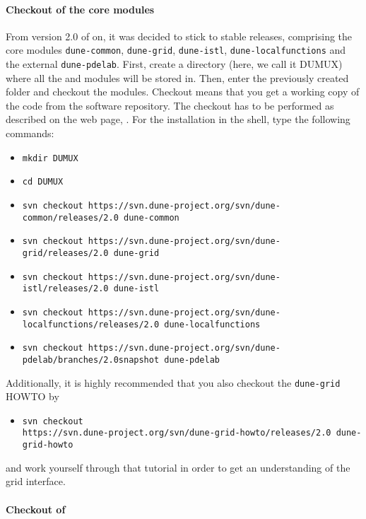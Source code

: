 \paragraph{Checkout of the core modules}
From version 2.0 of \Dune on, it was decided to stick to stable \Dune releases, comprising the core modules 
\texttt{dune-common}, \texttt{dune-grid}, \texttt{dune-istl}, \texttt{dune-localfunctions} and the external \texttt{dune-pdelab}.  
First, create a directory (here, we call it DUMUX) where all the \Dune and \Dumux modules will be stored in. 
Then, enter the previously created folder and checkout the modules. 
Checkout means that you get a working copy of the code from the software repository. 
The checkout has to be performed as described on the \Dune web page, \cite{DUNE-HP}. For the installation in the shell, type the following commands:
\begin{itemize}
\item \texttt{mkdir DUMUX}
\item \texttt{cd DUMUX}
\item \texttt{svn checkout https://svn.dune-project.org/svn/dune-common/releases/2.0 dune-common}
\item \texttt{svn checkout https://svn.dune-project.org/svn/dune-grid/releases/2.0 dune-grid}
\item \texttt{svn checkout https://svn.dune-project.org/svn/dune-istl/releases/2.0 dune-istl}
\item \texttt{svn checkout https://svn.dune-project.org/svn/dune-localfunctions/releases/2.0 dune-localfunctions}
\item \texttt{svn checkout https://svn.dune-project.org/svn/dune-pdelab/branches/2.0snapshot dune-pdelab}
\end{itemize} 

Additionally, it is highly recommended that you also checkout the \texttt{dune-grid} HOWTO by 
\begin{itemize}
\item \texttt{svn checkout \\
      \hspace{4cm} https://svn.dune-project.org/svn/dune-grid-howto/releases/2.0 dune-grid-howto}
\end{itemize}
and work yourself through that tutorial in order to get an understanding of the \Dune grid interface. 

\paragraph{Checkout of \Dumux}

